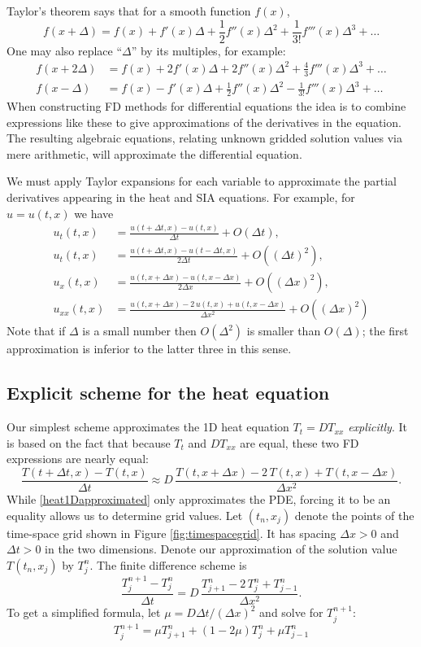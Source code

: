 \documentclass[letterpaper,final,12pt,reqno]{amsart}
\begin{document}
Taylor's theorem says that for a smooth function $f(x)$,
	$$f(x+\Delta) = f(x) + f'(x) \Delta + \frac{1}{2} f''(x) \Delta^2 + \frac{1}{3!} f'''(x) \Delta^3 + \dots$$
One may also replace ``$\Delta$'' by its multiples, for example:
\begin{align*}
f(x+2\Delta) &= f(x) + 2 f'(x) \Delta + 2 f''(x) \Delta^2 + \frac{4}{3} f'''(x) \Delta^3 + \dots \\
f(x-\Delta) &= f(x) - f'(x) \Delta + \frac{1}{2} f''(x) \Delta^2 - \frac{1}{3!} f'''(x) \Delta^3 + \dots
\end{align*}
When constructing FD methods for differential equations the idea is to combine expressions like these to give approximations of the derivatives in the equation.  The resulting algebraic equations, relating unknown gridded solution values via mere arithmetic, will approximate the differential equation.

We must apply Taylor expansions for each variable to approximate the partial derivatives appearing in the heat and SIA equations.  For example, for $u=u(t,x)$ we have
\begin{align*}
u_t(t,x) &= \frac{u(t+\Delta t,x) - u(t,x)}{\Delta t} + O(\Delta t), \\
u_t(t,x) &= \frac{u(t+\Delta t,x) - u(t-\Delta t,x)}{2\Delta t} + O((\Delta t)^2), \\
u_x(t,x) &= \frac{u(t,x+\Delta x) - u(t,x-\Delta x)}{2\Delta x} + O((\Delta x)^2), \\
u_{xx}(t,x) &= \frac{u(t,x+\Delta x) - 2\, u(t,x) + u(t,x-\Delta x)}{\Delta x^2} + O((\Delta x)^2)
\end{align*}
Note that if $\Delta$ is a small number then $O(\Delta^2)$ is smaller than $O(\Delta)$; the first approximation is inferior to the latter three in this sense.

\subsection*{Explicit scheme for the heat equation}  Our simplest scheme approximates the 1D heat equation $T_t=D T_{xx}$ \emph{explicitly}.  It is based on the fact that because $T_t$ and $D T_{xx}$ are equal, these two FD expressions are nearly equal:
\begin{equation}
\frac{T(t+\Delta t,x) - T(t,x)}{\Delta t} \approx D\,\frac{T(t,x+\Delta x) - 2\, T(t,x) + T(t,x-\Delta x)}{\Delta x^2}.  \label{heat1Dapproximated}
\end{equation}
While \eqref{heat1Dapproximated} only approximates the PDE, forcing it to be an equality allows us to determine grid values.  Let $(t_n,x_j)$ denote the points of the time-space grid shown in Figure \ref{fig:timespacegrid}.  It has spacing $\Delta x>0$ and $\Delta t>0$ in the two dimensions.  Denote our approximation of the solution value $T(t_n,x_j)$ by $T_j^n$.  The finite difference scheme is
	$$\frac{T_j^{n+1} - T_j^n}{\Delta t} = D\,\frac{T_{j+1}^n - 2\, T_j^n + T_{j-1}^n}{\Delta x^2}.$$
To get a simplified formula, let $\mu = D \Delta t / (\Delta x)^2$ and solve for $T_j^{n+1}$:
\begin{equation}
  T_j^{n+1} = \mu T_{j+1}^n + (1 - 2 \mu) T_j^n + \mu T_{j-1}^n \label{heat1Dfd}
\end{equation}
\end{document}
